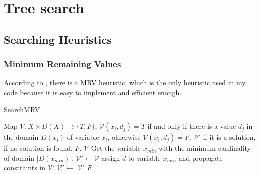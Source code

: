 \documentclass[a4paper, 12pt]{report}
\begin{document}
\chapter {Tree search}

    \section {Searching Heuristics}
        \subsection {Minimum Remaining Values}
            According to \cite{golomb1965backtrack}, there is a MRV heuristic, which is the only heuristic used in my code because it is easy to implement and efficient enough.
            \begin{algorithm}
                \caption{SearchMRV}
                \label{MRV}
                \begin{algorithmic}[1]
                    \Require Map $\mathcal V:X\times D(X) \to \{T,F\}$, $\mathcal V(x_i,d_j)=T$ if and only if there is a value $d_j$ in the domain $D(x_i)$ of variable $x_i$, otherwise $\mathcal V(x_i,d_j)=F$. 
                    \Ensure $\mathcal V'$ if it is a solution, if no solution is found, $F$.
                            \State \Return $\mathcal V$
                        \EndIf
                        \State Get the variable $x_{min}$ with the minimum cardinality of domain $|D(x_{min})|$.
                            \State $\mathcal V' \gets \mathcal V$ 
                            \State assign $d$ to variable $x_{min}$ and propagate constraints in $\mathcal V'$
                                \State $\mathcal V'\gets$ 
                                    \State \Return $\mathcal V'$
                                \EndIf
                            \EndIf
                        \EndFor
                        \State \Return $F$
                    \EndFunction
                \end{algorithmic}
            \end{algorithm}
\end{document}
